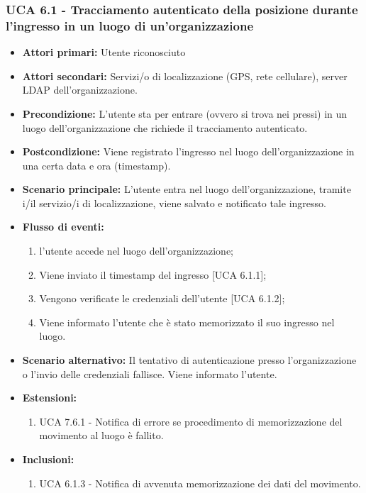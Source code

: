 \subsubsection{UCA 6.1 - Tracciamento autenticato della posizione durante l'ingresso in un luogo di un'organizzazione}
\begin{itemize}
	\item \textbf{Attori primari:} Utente riconosciuto
	\item \textbf{Attori secondari:} Servizi/o di localizzazione (GPS, rete cellulare), server LDAP dell'organizzazione.
	\item \textbf{Precondizione:} L'utente sta per entrare (ovvero si trova nei pressi) in un luogo dell'organizzazione che richiede il tracciamento autenticato.
	\item \textbf{Postcondizione:} Viene registrato l'ingresso nel luogo dell'organizzazione in una certa data e ora (timestamp).
	\item \textbf{Scenario principale:} L'utente entra nel luogo dell'organizzazione, tramite i/il servizio/i di localizzazione, viene salvato e notificato tale ingresso.
	\item \textbf{Flusso di eventi:}
	\begin{enumerate}
		\item l'utente accede nel luogo dell'organizzazione;
		\item Viene inviato il timestamp  del ingresso [UCA 6.1.1];
		\item Vengono verificate le credenziali dell'utente [UCA 6.1.2];
		\item Viene informato l'utente che è stato memorizzato il suo ingresso nel luogo.
	\end{enumerate}
	\item \textbf{Scenario alternativo:} Il tentativo di autenticazione presso l'organizzazione o l'invio delle credenziali fallisce. Viene informato l'utente.
	\item \textbf{Estensioni:}
	\begin{enumerate}
		\item UCA 7.6.1 - Notifica di errore se procedimento di memorizzazione del movimento al luogo è fallito.
	\end{enumerate}
	\item \textbf{Inclusioni:}
	\begin{enumerate}
		\item UCA 6.1.3 - Notifica di avvenuta memorizzazione dei dati del movimento.
	\end{enumerate}
\end{itemize}

